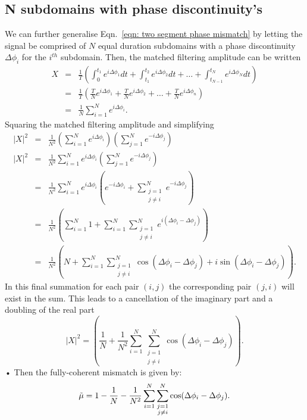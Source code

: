 \documentclass[../full_thesis/full_thesis.tex]{subfiles}
\begin{document}
\subsection{N subdomains with phase discontinuity's}
We can further generalise Eqn.~\eqref{eqn: two segment phase mismatch} by
letting the signal be comprised of $N$ equal duration subdomains with a phase discontinuity
$\Delta\phi_i$ for the $i^{th}$ subdomain.
Then, the matched filtering amplitude can be written
\begin{eqnarray}
X & = & \frac{1}{T}\left(\int_{0}^{t_{1}}e^{i\Delta\phi_{1}} dt +
\int_{t_{1}}^{t_{2}}e^{i\Delta\phi_{2}} dt + \dots +
\int_{t_{N-1}}^{t_{N}}e^{i\Delta\phi_{N}} dt \right) \\
& = &  \frac{1}{T}\left(\frac{T}{N}e^{i\Delta\phi_{1}} +
\frac{T}{N}e^{i\Delta\phi_{2}} + \dots + \frac{T}{N}e^{i\Delta\phi_{n}} \right)\\
& = & \frac{1}{N} \sum_{i=1}^{N}e^{i\Delta \phi_{i}}.
\end{eqnarray}
Squaring the matched filtering amplitude and simplifying
\begin{eqnarray}
|X|^{2} & = &  \frac{1}{N^{2}} \left(\sum_{i=1}^{N}e^{i\Delta \phi_{i}}\right)\left(\sum_{j=1}^{N}e^{-i\Delta \phi_{j}}\right) \\
|X|^{2} & = &  \frac{1}{N^{2}} \sum_{i=1}^{N}e^{i\Delta \phi_{i}}\left(\sum_{j=1}^{N}e^{-i\Delta \phi_{j}}\right) \\
& = & \frac{1}{N^{2}} \sum_{i=1}^{N}e^{i\Delta \phi_{i}}\left(e^{-i\Delta \phi_{i}} +  \sum_{\substack{j=1 \\j\ne i}}^{N}e^{-i\Delta \phi_{j}}\right) \\
& = & \frac{1}{N^{2}} \left(\sum_{i=1}^{N}1 +   \sum_{i=1}^{N}\sum_{\substack{j=1 \\j\ne i}}^{N}e^{i(\Delta\phi_{i}-\Delta \phi_{j})}\right) \\
& = & \frac{1}{N^{2}} \left(N +   \sum_{i=1}^{N}\sum_{\substack{j=1 \\j\ne i}}^{N}\cos(\Delta\phi_{i} - \Delta\phi_{j}) + i\sin(\Delta\phi_{i} - \Delta\phi_{j})\right).
\end{eqnarray}
In this final summation for each pair $(i,j)$ the corresponding pair $(j, i)$
will exist in the sum. This leads to a cancellation of the imaginary part and a
doubling of the real part
\begin{equation}
|X|^{2}  = \left(\frac{1}{N} + \frac{1}{N^{2}}\sum_{i=1}^{N}\sum_{\substack{j=1 \\j\ne i}}^{N} \cos(\Delta\phi_{i} - \Delta \phi_{j})\right).
\end{equation}•
Then the fully-coherent mismatch is given by:
\begin{equation}
\tilde{\mu} = 1 - \frac{1}{N} - \frac{1}{N^{2}}\sum_{i=1}^{N}\sum_{\substack{j=1 \\j\ne i}}^{N} \cos(\Delta\phi_{i} - \Delta\phi_{j}).
\label{eqn: phase mismatch}
\end{equation}
\end{document}
